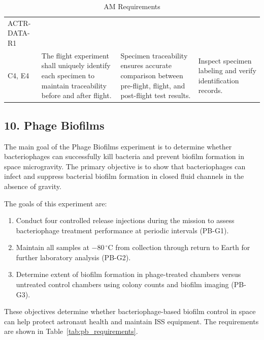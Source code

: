 \documentclass[conf]{new-aiaa}
\begin{document}
\begin{table}[H]
\begin{tabularx}{\textwidth}{@{}>{\raggedright\arraybackslash}m{2.4cm}YYY@{}}
    ACTR-DATA-R1\\C4, E4 &
    The flight experiment shall uniquely identify each specimen to maintain traceability before and after flight. &
    Specimen traceability ensures accurate comparison between pre-flight, flight, and post-flight test results. &
    Inspect specimen labeling and verify identification records. \\
    \bottomrule
    \end{tabularx}
    \caption{AM Requirements}
    \label{tab:am_requirements}
\end{table}


\clearpage
\subsection{10. Phage Biofilms}

The main goal of the Phage Biofilms experiment is to determine whether bacteriophages can successfully kill bacteria and prevent biofilm formation in space microgravity. The primary objective is to show that bacteriophages can infect and suppress bacterial biofilm formation in closed fluid channels in the absence of gravity. \cite{tamu-spirit-rfp}

The goals of this experiment are:
\begin{enumerate}[leftmargin=*]
    \item Conduct four controlled release injections during the mission to assess bacteriophage treatment performance at periodic intervals (PB-G1).
    \item Maintain all samples at $-80\,^{\circ}$C from collection through return to Earth for further laboratory analysis (PB-G2).
    \item Determine extent of biofilm formation in phage-treated chambers versus untreated control chambers using colony counts and biofilm imaging (PB-G3).
\end{enumerate}

These objectives determine whether bacteriophage-based biofilm control in space can help protect astronaut health and maintain ISS equipment. The requirements are shown in Table~\ref{tab:pb_requirements}.
\end{document}
